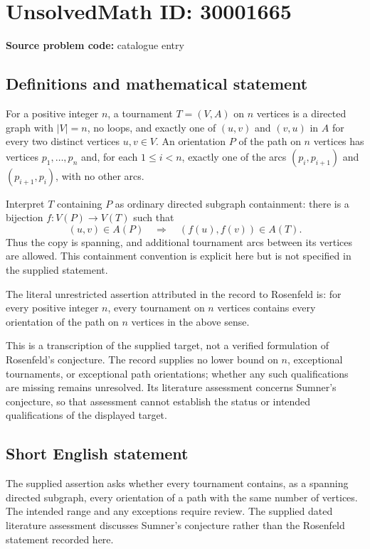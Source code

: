 \documentclass[11pt]{article}
\begin{document}
\section*{UnsolvedMath ID: 30001665}
\textbf{Source problem code:} catalogue entry
\subsection{Definitions and mathematical statement}
For a positive integer \(n\), a tournament \(T=(V,A)\) on \(n\) vertices is a directed graph with \(|V|=n\), no loops, and exactly one of \((u,v)\) and \((v,u)\) in \(A\) for every two distinct vertices \(u,v\in V\). An orientation \(P\) of the path on \(n\) vertices has vertices \(p_1,\ldots,p_n\) and, for each \(1\leq i<n\), exactly one of the arcs \((p_i,p_{i+1})\) and \((p_{i+1},p_i)\), with no other arcs.

Interpret \(T\) containing \(P\) as ordinary directed subgraph containment: there is a bijection \(f:V(P)\to V(T)\) such that
\[
(u,v)\in A(P)\quad\Longrightarrow\quad(f(u),f(v))\in A(T).
\]
Thus the copy is spanning, and additional tournament arcs between its vertices are allowed. This containment convention is explicit here but is not specified in the supplied statement.

The literal unrestricted assertion attributed in the record to Rosenfeld is: for every positive integer \(n\), every tournament on \(n\) vertices contains every orientation of the path on \(n\) vertices in the above sense.

This is a transcription of the supplied target, not a verified formulation of Rosenfeld's conjecture. The record supplies no lower bound on \(n\), exceptional tournaments, or exceptional path orientations; whether any such qualifications are missing remains unresolved. Its literature assessment concerns Sumner's conjecture, so that assessment cannot establish the status or intended qualifications of the displayed target.
\subsection{Short English statement}
The supplied assertion asks whether every tournament contains, as a spanning directed subgraph, every orientation of a path with the same number of vertices. The intended range and any exceptions require review. The supplied dated literature assessment discusses Sumner's conjecture rather than the Rosenfeld statement recorded here.
\end{document}
